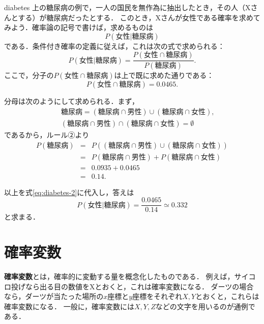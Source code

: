 \documentclass[a5j, uplatex, dvipdfmx]{jsbook}
\makeatletter
\newcommand{\ind}[2]{\textbf{#1}\index{#2@#1}}
\makeatother
\begin{document}
    \begin{ex}{}{diabetes}
        上の糖尿病の例で，一人の国民を無作為に抽出したとき，その人（Xさんとする）が糖尿病だったとする．
        このとき，Xさんが女性である確率を求めてみよう．確率論の記号で書けば，求めるものは
        \begin{equation*}
            P(女性|糖尿病)
        \end{equation*}
        である．条件付き確率の定義に従えば，これは次の式で求められる：
        \begin{equation}
            P(女性|糖尿病) = \frac{P(女性\cap 糖尿病)}{P(糖尿病)}. \label{eq:diabetes-2}
        \end{equation}
        ここで，分子の$P(女性\cap 糖尿病)$は上で既に求めた通りである：
        \begin{equation*}
            P(女性\cap 糖尿病) = 0.0465.
        \end{equation*}

        分母は次のようにして求められる．まず，
        \begin{eqnarray*}
            &&糖尿病 = (糖尿病 \cap 男性) \cup (糖尿病 \cap 女性), \\
            &&(糖尿病 \cap 男性) \cap (糖尿病 \cap 女性) = \emptyset
        \end{eqnarray*}
        であるから，ルール②より
        \begin{eqnarray*}
            P(糖尿病)
            &=& P((糖尿病 \cap 男性) \cup (糖尿病 \cap 女性)) \\
            &=& P(糖尿病 \cap 男性) + P(糖尿病 \cap 女性) \\
            &=& 0.0935 + 0.0465 \\
            &=& 0.14.
        \end{eqnarray*}

        以上を式\eqref{eq:diabetes-2}に代入し，答えは
        \begin{equation*}
            P(女性|糖尿病) = \frac{0.0465}{0.14} \simeq 0.332
        \end{equation*}
        と求まる．
    \end{ex}

\section{確率変数}
    \ind{確率変数}{かくりつへんすう}とは，確率的に変動する量を概念化したものである．
    例えば，サイコロ投げなら出る目の数値をXとおくと，これは確率変数になる．
    ダーツの場合なら，ダーツが当たった場所の$x$座標と$y$座標をそれぞれ$X,Y$とおくと，これらは確率変数になる．
    一般に，確率変数には$X,Y,Z$などの文字を用いるのが通例である．
\end{document}
